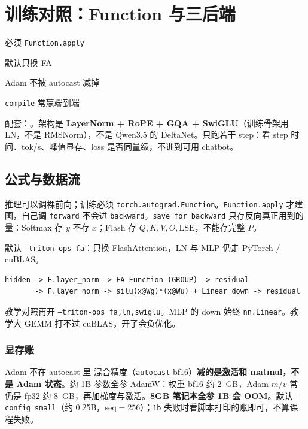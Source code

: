 \chapter{训练对照：Function 与三后端}

\begin{introduction}
  \item 必须 \texttt{Function.apply}
  \item 默认只换 FA
  \item Adam 不被 autocast 减掉
  \item \texttt{compile} 常赢端到端
\end{introduction}

配套：。架构是 \textbf{LayerNorm + RoPE + GQA + SwiGLU}（训练骨架用 LN，不是 RMSNorm），不是 Qwen3.5 的 DeltaNet。只跑若干 step：看 step 时间、tok/s、峰值显存、loss 是否同量级，不训到可用 chatbot。

\section{公式与数据流}

推理可以调裸前向；训练必须 \texttt{torch.autograd.Function}。\texttt{Function.apply} 才建图，自己调 \texttt{forward} 不会进 \texttt{backward}。\texttt{save\_for\_backward} 只存反向真正用到的量：Softmax 存 $y$ 不存 $x$；Flash 存 $Q,K,V,O,\mathrm{LSE}$，不能存完整 $P$。

默认 \texttt{--triton-ops fa}：只换 FlashAttention，LN 与 MLP 仍走 PyTorch / cuBLAS。

\figtrainops

\begin{lstlisting}[style=shell]
hidden -> F.layer_norm -> FA Function (GROUP) -> residual
       -> F.layer_norm -> silu(x@Wg)*(x@Wu) + Linear down -> residual
\end{lstlisting}

教学对照再开 \texttt{--triton-ops fa,ln,swiglu}。MLP 的 down 始终 \texttt{nn.Linear}。教学大 GEMM 打不过 cuBLAS，开了会负优化。


\subsection{显存账}

\begin{proposition}{Adam 不在 autocast 里}
混合精度（\texttt{autocast} bf16）\textbf{减的是激活和 matmul，不是 Adam 状态}。约 1B 参数全参 AdamW：权重 bf16 约 2~GB，Adam $m/v$ 常仍是 fp32 约 8~GB，再加梯度与激活。\textbf{8GB 笔记本全参 1B 会 OOM}。默认 \texttt{--config small}（约 0.25B，$\mathrm{seq}=256$）；\texttt{1b} 失败时看脚本打印的账即可，不算课程失败。
\end{proposition}

